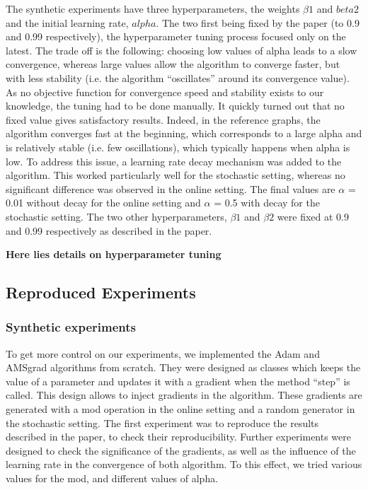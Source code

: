 \documentclass[letterpaper, 10 pt, conference]{ieeeconf}  %
\begin{document}
The synthetic experiments have three hyperparameters, the weights $\beta 1$ and $beta 2$ and the initial learning rate, $alpha$. The two first being fixed by the paper (to 0.9 and 0.99 respectively), the hyperparameter tuning process focused only on the latest. The trade off is the following: choosing low values of alpha leads to a slow convergence, whereas large values allow the algorithm to converge faster, but with less stability (i.e. the algorithm “oscillates” around its convergence value).
As no objective function for convergence speed and stability exists to our knowledge, the tuning had to be done manually. It quickly turned out that no fixed value gives satisfactory results. Indeed, in the reference graphs, the algorithm converges fast at the beginning, which corresponds to a large alpha and is relatively stable (i.e. few oscillations), which typically happens when alpha is low. To address this issue, a learning rate decay mechanism was added to the algorithm. This worked particularly well for the stochastic setting, whereas no significant difference was observed in the online setting.
The final values are $\alpha$ = 0.01 without decay for the online setting and $\alpha$ = 0.5 with decay for the stochastic setting. The two other hyperparameters, $\beta 1$ and $\beta 2$ were fixed at 0.9 and 0.99 respectively as described in the paper.

\textbf{Here lies details on hyperparameter tuning}

\subsection{Reproduced Experiments}

\subsubsection{Synthetic experiments}
To get more control on our experiments, we implemented the Adam and AMSgrad algorithms from scratch. They were designed as classes which keeps the value of a parameter and updates it with a gradient when the method “step” is called. This design allows to inject gradients in the algorithm. These gradients are generated with a mod operation in the online setting and a random generator in the stochastic setting.
The first experiment was to reproduce the results described in the paper, to check their reproducibility. Further experiments were designed to check the significance of the gradients, as well as the influence of the learning rate in the convergence of both algorithm. To this effect, we tried various values for the mod, and different values of alpha.
\end{document}
